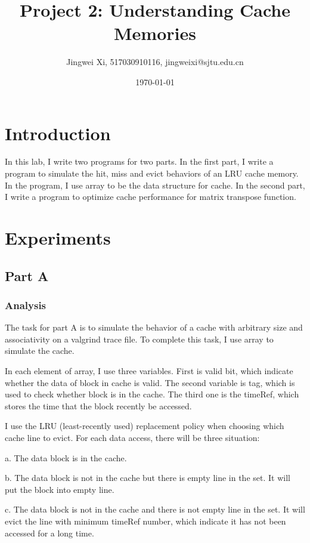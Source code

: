 \documentclass{article}
\title{\textbf{Project 2:  Understanding Cache Memories}} %
\author{Jingwei Xi, 517030910116, jingweixi@sjtu.edu.cn } %
\date{\today} %
\begin{document}
\maketitle %

\section{Introduction}


In this lab, I write two programs for two parts. In the first part, I write a program to simulate the hit, miss and evict behaviors of an LRU cache memory. In the program, I use array to be the data structure for cache. In the second part, I write a program to optimize cache performance for matrix transpose function.

\section{Experiments}

\subsection{Part A}

\subsubsection{Analysis}


The task for part A is to simulate the behavior of a cache with arbitrary size and associativity on a valgrind trace file. To complete this task, I use array to simulate the cache.

In each element of array, I use three variables. First is valid bit, which indicate whether the data of block in cache is valid. The second variable is tag, which is used to check whether block is in the cache. The third one is the timeRef, which stores the time that the block recently be accessed. 

I use the LRU (least-recently used) replacement policy when choosing which cache line to evict. For each data access, there will be three situation: 

a. The data block is in the cache. 

b. The data block is not in the cache but there is empty line in the set. It will put the block into empty line.

 c. The data block is not in the cache and there is not empty line in the set. It will evict the line with minimum timeRef number, which indicate it has not been accessed for a long time.
\end{document}

